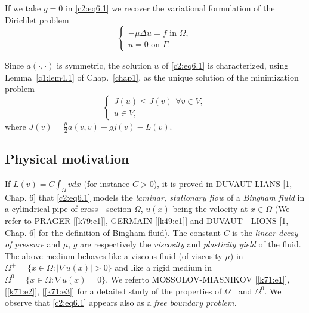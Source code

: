 \begin{remark}\label{c2:rem6.1}%
If we take $g= 0$ in \eqref{c2:eq6.1} we recover the variational
formulation of the Dirichlet problem 
\begin{equation*}
\begin{cases}
- \mu \Delta u= f \text{ in } \Omega,\\
u = 0 \text{ on } \Gamma.
\end{cases}
\end{equation*}
\end{remark}

\begin{remark}\label{c2:rem6.2}%
Since $a(\cdot, \cdot)$ is symmetric, the solution $u$ of \eqref{c2:eq6.1} is
characterized, using Lemma~\ref{c1:lem4.1} of Chap.~\ref{chap1}, as
the unique solution of the minimization problem 
\begin{equation}
\begin{cases}
J(u) \leq J (v) ~\, \forall  v \in V,\\
u \in V,
\end{cases}
\tag{6.3}\label{c2:eq6.3}
\end{equation}
where $J(v) = \frac{\mu}{2} a (v, v) + gj (v) - L (v)$.
\end{remark}

\subsection{Physical motivation}\label{c2:ss6.2}%

If $L (v) = C \int_{\Omega} v dx$ (for instance $C > 0$), it is proved
in DUVAUT-LIANS [1, Chap. 6] that \eqref{c2:eq6.1} models the
\textit{laminar,   stationary flow} of a \textit{Bingham fluid} in a cylindrical pipe of 
cross - section $\Omega$, $u(x)$ being the velocity at $x \in
\Omega$ (We refer to PRAGER [\ref{k79:e1}], GERMAIN [\ref{k49:e1}] and DUVAUT - LIONS [1,
  Chap. 6] for the definition of Bingham fluid). The constant $C$ is
the \textit{ linear decay of pressure } and $\mu$, $g$ are
respectively the \textit{ viscosity } and \textit{ plasticity yield }
of the fluid. The above medium behaves like a viscous fluid (of
viscosity $\mu$) in $\Omega^+ = \{ x \in \Omega : | \nabla
u(x) | > 0 \}$ and like a rigid medium in $\Omega^0 = \{ x \in
\Omega : \nabla u (x) = 0\}$. We refer\pageoriginale  to MOSSOLOV-MIASNIKOV
       [\ref{k71:e1}], [\ref{k71:e2}], [\ref{k71:e3}] for a detailed study of the properties of
       $\Omega^+$ and $\Omega^0$. We observe that \eqref{c2:eq6.1} appears also
       as a \textit{free boundary problem.} 

